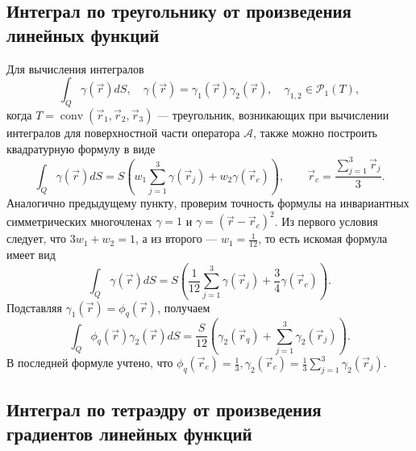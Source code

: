 \subsection{Интеграл по треугольнику от произведения линейных функций}

Для вычисления интегралов
\[
\int_{Q} \gamma(\vec r) dS, \quad \gamma(\vec r) = \gamma_1(\vec r)\gamma_2(\vec r), \quad \gamma_{1,2} \in \mathcal{P}_1(T),
\]
когда $T = \operatorname{conv}(\vec r_1, \vec r_2, \vec r_3)$ --- треугольник, возникающих при вычислении интегралов для поверхностной части оператора $\mathcal{A}$, также можно построить квадратурную формулу в виде
\[
\int_{Q} \gamma(\vec r) dS = S \left(w_1 \sum_{j = 1}^3 \gamma(\vec r_j) + w_2 \gamma(\vec r_c)\right), \qquad \vec r_c = \frac{\sum_{j=1}^3 \vec r_j}{3}.
\]
Аналогично предыдущему пункту, проверим точность формулы на инвариантных симметрических многочленах $\gamma = 1$ и $\gamma = (\vec r - \vec r_c)^2$. Из первого условия следует, что
$3w_1 + w_2 = 1$, а из второго --- $w_1 = \frac{1}{12}$, то есть искомая формула имеет вид
\[
\int_{Q} \gamma(\vec r) dS = S \left(\frac{1}{12} \sum_{j = 1}^3 \gamma(\vec r_j) + \frac{3}{4} \gamma(\vec r_c)\right).
\]
Подставляя $\gamma_1(\vec r) = \phi_q(\vec r)$, получаем
\[
\int_{Q} \phi_q(\vec r)\gamma_2(\vec r) dS = \frac{S}{12} \left( \gamma_2(\vec r_q) + \sum_{j=1}^3 \gamma_2(\vec r_j)\right).
\]
В последней формуле учтено, что $\phi_q(\vec r_c) = \frac{1}{3}, \gamma_2(\vec r_c) = \frac{1}{3}\sum_{j=1}^3\gamma_2(\vec r_j)$.

\subsection{Интеграл по тетраэдру от произведения градиентов линейных функций}

